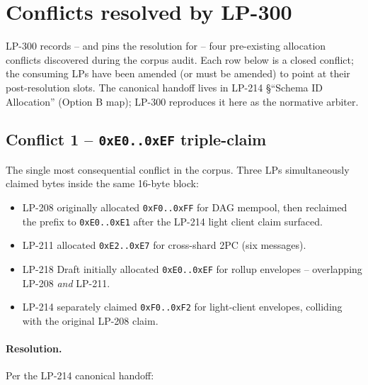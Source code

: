 \section{Conflicts resolved by LP-300}
\label{sec:conflicts}

LP-300 records -- and pins the resolution for -- four pre-existing
allocation conflicts discovered during the corpus audit. Each row
below is a closed conflict; the consuming LPs have been amended (or
must be amended) to point at their post-resolution slots. The
canonical handoff lives in LP-214 \S``Schema ID Allocation'' (Option B
map); LP-300 reproduces it here as the normative arbiter.

\subsection{Conflict 1 -- \texttt{0xE0..0xEF} triple-claim}

The single most consequential conflict in the corpus. Three LPs
simultaneously claimed bytes inside the same 16-byte block:

\begin{itemize}[leftmargin=2em,nosep]
\item LP-208 originally allocated \texttt{0xF0..0xFF} for DAG mempool,
  then reclaimed the prefix to \texttt{0xE0..0xE1} after the LP-214
  light client claim surfaced.
\item LP-211 allocated \texttt{0xE2..0xE7} for cross-shard 2PC (six
  messages).
\item LP-218 Draft initially allocated \texttt{0xE0..0xEF} for
  rollup envelopes -- overlapping LP-208 \emph{and} LP-211.
\item LP-214 separately claimed \texttt{0xF0..0xF2} for light-client
  envelopes, colliding with the original LP-208 claim.
\end{itemize}

\paragraph{Resolution.} Per the LP-214 canonical handoff:


